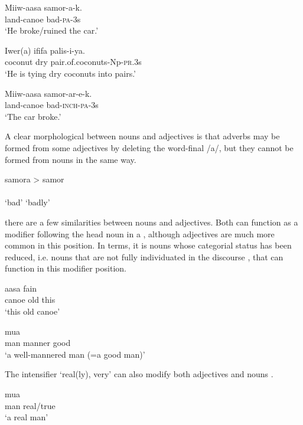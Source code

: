 \ea%
\label{ex:3:x482}
\gll Miiw-aasa samor-a-k. \\
land-canoe bad-\textsc{pa}-3s\\
\glt`He broke/ruined the car.'
\z

\ea%
\label{ex:3:x484}
\gll Iwer(a) ififa palis-i-ya. \\
coconut dry pair.of.coconuts-Np-\textsc{pr}.3s\\
\glt`He is tying dry coconuts into pairs.'
\z

\ea%
\label{ex:3:x483}
\gll Miiw-aasa samor-ar-e-k. \\
land-canoe bad-\textsc{inch}-\textsc{pa}-3s\\
\glt`The car broke.'
\z

A clear morphological  between nouns and adjectives is that adverbs may be formed from some adjectives by deleting the word-final /a/, but they cannot be formed from nouns in the same way.

\ea%
\label{ex:3:x19}
\gll samora {{\textgreater} samor} \\
 \\
\glt`bad' `badly'
\z

 there are a few similarities between nouns and adjectives. Both can function as a modifier following the head noun in a , although adjectives  are much more common in this position. In  terms, it is nouns whose categorial status has been reduced, i.e. nouns that are not fully individuated in the discourse , that can function in this modifier position.

\ea%
\label{ex:3:x9}
\gll aasa  fain \\
canoe old this\\
\glt`this old canoe'
\z

\ea%
\label{ex:3:x10}
\gll mua   \\
man manner good\\
\glt`a well-mannered man (=a good man)'
\z

The intensifier  `real(ly), very' can also modify both adjectives  and nouns .

\ea%
\label{ex:3:x11}
\gll mua  \\
man real/true\\
\glt`a real man'
\z

